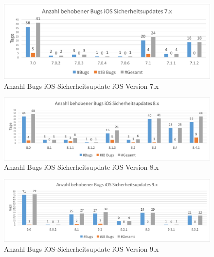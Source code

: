 \begin{figure}[htbp]
        \centering
                \includegraphics[scale=0.7]{Bilder/iOSSicherheitsupdate7.png}
        \caption{Anzahl Bugs iOS-Sicherheitsupdate iOS Version 7.x}
        \label{fig:AnalyseiOSSicherheitsupdate7}
\end{figure}

\begin{figure}[htbp]
        \centering
                \includegraphics[scale=0.6]{Bilder/iOSSicherheitsupdate8.png}
        \caption{Anzahl Bugs iOS-Sicherheitsupdate iOS Version 8.x}
        \label{fig:AnalyseiOSSicherheitsupdate8}
\end{figure}

\begin{figure}[htbp]
        \centering
                \includegraphics[scale=0.55]{Bilder/iOSSicherheitsupdate9.png}
        \caption{Anzahl Bugs iOS-Sicherheitsupdate iOS Version 9.x}
        \label{fig:AnalyseiOSSicherheitsupdate9}
\end{figure}





 